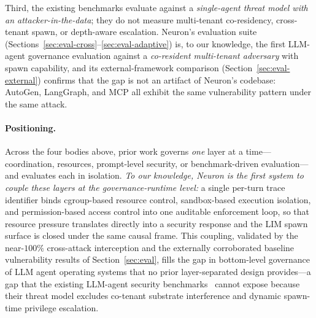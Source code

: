 Third, the existing benchmarks evaluate against a \emph{single-agent
threat model with an attacker-in-the-data}; they do not measure
multi-tenant co-residency, cross-tenant spawn, or depth-aware escalation.
Neuron's evaluation suite
(Sections~\ref{sec:eval-cross}--\ref{sec:eval-adaptive}) is, to our
knowledge, the first LLM-agent governance evaluation against a
\emph{co-resident multi-tenant adversary} with spawn capability, and its
external-framework comparison
(Section~\ref{sec:eval-external}) confirms that the gap is not an artifact
of Neuron's codebase: AutoGen, LangGraph, and MCP all exhibit the same
vulnerability pattern under the same attack.

\paragraph{Positioning.}
Across the four bodies above, prior work governs \emph{one} layer at a
time---coordination, resources, prompt-level security, or
benchmark-driven evaluation---and evaluates each in isolation.
\emph{To our knowledge, Neuron is the first system to couple these
layers at the governance-runtime level:} a single per-turn trace
identifier binds cgroup-based resource
control, sandbox-based execution isolation, and permission-based access
control into one auditable enforcement loop, so that resource pressure
translates directly into a security response and the LIM spawn surface is
closed under the same causal frame. This coupling, validated by the
near-$100\%$ cross-attack interception and the externally corroborated
baseline vulnerability results of Section~\ref{sec:eval}, fills the gap in
bottom-level governance of LLM agent operating systems that no prior
layer-separated design provides---a gap that the existing LLM-agent
security benchmarks~\cite{debenedetti2024agentdojo,zhan2024injecagent,chen2024agentsecurity}
cannot expose because their threat model excludes co-tenant substrate
interference and dynamic spawn-time privilege escalation.
